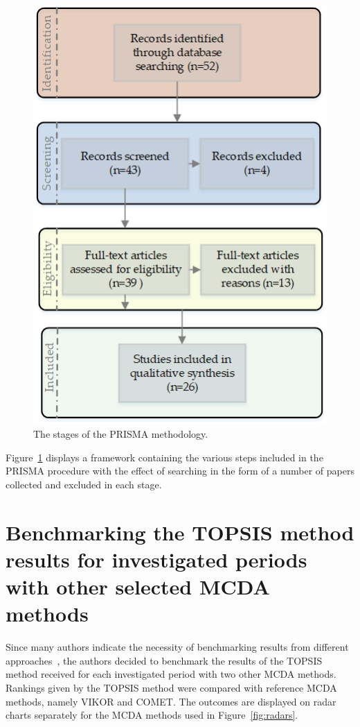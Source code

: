 \documentclass[5p,times]{elsarticle}
\begin{document}
%
\begin{figure}[H]
    \centering
    \includegraphics[width=0.7\linewidth]{PRISMA_v102.png}
    \caption{The stages of the PRISMA methodology.}
    \label{fig:PRISMA}
\end{figure}
%
Figure~\ref{fig:PRISMA} displays a framework containing the various steps included in the PRISMA procedure with the effect of searching in the form of a number of papers collected and excluded in each stage.

\section{Benchmarking the TOPSIS method results for investigated periods with other selected MCDA methods}
\label{sec:app1}

Since many authors indicate the necessity of benchmarking results from different approaches~\cite{cinelli2020support, cinelli2022recommending}, the authors decided to benchmark the results of the TOPSIS method received for each investigated period with two other MCDA methods. Rankings given by the TOPSIS method were compared with reference MCDA methods, namely VIKOR and COMET. The outcomes are displayed on radar charts separately for the MCDA methods used in Figure~\ref{fig:radars}.
\end{document}
